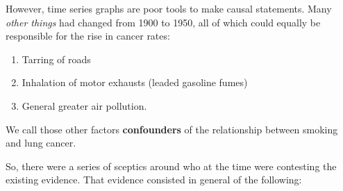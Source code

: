 \documentclass[]{book}
\providecommand{\tightlist}{%
  \setlength{\itemsep}{0pt}\setlength{\parskip}{0pt}}
\begin{document}
However, time series graphs are poor tools to make causal statements. Many \emph{other things} had changed from 1900 to 1950, all of which could equally be responsible for the rise in cancer rates:

\begin{enumerate}
\def\labelenumi{\arabic{enumi}.}
\tightlist
\item
  Tarring of roads
\item
  Inhalation of motor exhausts (leaded gasoline fumes)
\item
  General greater air pollution.
\end{enumerate}

We call those other factors \textbf{confounders} of the relationship between smoking and lung cancer.

So, there were a series of sceptics around who at the time were contesting the existing evidence. That evidence consisted in general of the following:
\end{document}
